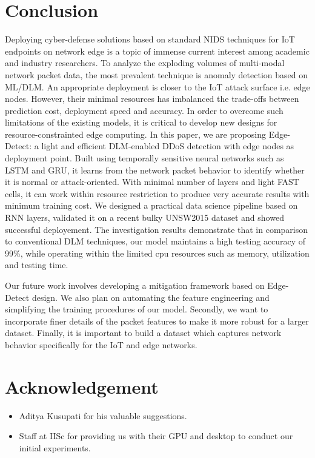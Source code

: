 \documentclass[conference]{IEEEtran}
\begin{document}
\section{Conclusion} \label{Sec:Conclusion}
\noindent Deploying cyber-defense solutions based on standard NIDS techniques for IoT endpoints on network edge is a topic of immense current interest among academic and industry researchers. 
To analyze the exploding volumes of multi-modal network packet data, the most prevalent technique is anomaly detection based on ML/DLM. 
An appropriate deployment is closer to the IoT attack surface i.e. edge nodes. 
However, their minimal resources has imbalanced the trade-offs between prediction cost, deployment speed and accuracy. 
In order to overcome such limitations of the existing models, it is critical to develop new designs for resource-constrainted edge computing. 
In this paper, we are proposing Edge-Detect: a light and efficient DLM-enabled DDoS detection with edge nodes as deployment point.
Built using temporally sensitive neural networks such as LSTM and GRU, it learns from the network packet behavior to identify whether it is normal or attack-oriented. 
With minimal number of layers and light FAST cells, it can work within resource restriction to produce very accurate results with minimum training cost. 
We designed a practical data science pipeline based on RNN layers, validated it on a recent bulky UNSW2015 dataset and showed successful deployement. 
The investigation results demonstrate that in comparison to conventional DLM techniques, our model maintains a high testing accuracy of 99\%, while operating within the limited cpu resources such as memory, utilization and testing time.

Our future work involves developing a mitigation framework based on  Edge-Detect design. We also plan on automating the feature engineering and simplifying the training procedures of our model.
Secondly, we want to incorporate finer details of the packet features to make it more robust for a larger dataset. 
Finally, it is important to build a dataset which captures network behavior specifically for the IoT and edge networks.

\section{Acknowledgement}
\label{ACKNOWLEDGEMENT}
\begin{itemize}
    \item[] Aditya Kusupati for his valuable suggestions.
    \item[] Staff at IISc for providing us with their GPU and desktop to conduct our initial experiments.
\end{itemize}
\end{document}
